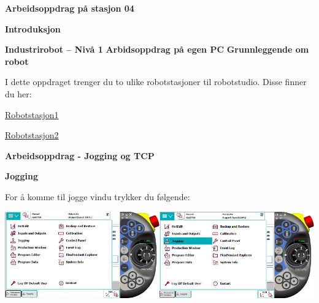 \newpage


\begin{center}
\textbf{Arbeidsoppdrag på stasjon 04}
\vskip 5pt 
\vskip 5pt 
\end{center}

\vskip 10pt 
\textbf{Introduksjon}

\noindent

\vskip 5pt

\vskip 5pt
\begin{center}
\vskip 5pt 
\textbf{Industrirobot -- Nivå 1 }
\vskip 5pt 
\textbf{Arbidsoppdrag på egen PC}
\vskip 5pt 
\textbf{Grunnleggende om robot}
\end{center}

\vskip 5pt 
I dette oppdraget trenger du to ulike robotstasjoner til robotstudio. Disse finner du her:

\vskip 5pt 
\href{https://rfka-my.sharepoint.com/:u:/r/personal/fred-olav_mosdal_skole_rogfk_no/Documents/ForAutofaget.no/Robotstasjon1.rspag?csf=1&web=1&e=Zm7EG9}{Robotstasjon1}

\vskip 5pt 
\href{https://rfka-my.sharepoint.com/:u:/r/personal/fred-olav_mosdal_skole_rogfk_no/Documents/ForAutofaget.no/Robotstasjon2.rspag?csf=1&web=1&e=kk7j4H}{Robotstasjon2}

\vskip 5pt 
\textbf{Arbeidsoppdrag - Jogging og TCP}

\textbf{Jogging}

\vspace{1cm}

For å komme til jogge vindu trykker du følgende:

\vspace{1cm}

\includegraphics[width=0.5\textwidth]{i04861x01}\includegraphics[width=0.5\textwidth]{i04861x02}

